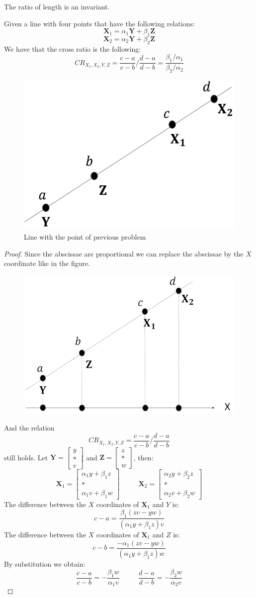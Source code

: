 \documentclass[12pt, a4paper]{report}
\newtheorem[style=M,bodystyle=\normalfont]{theorem}{Theorem}
\newtheorem[style=M,bodystyle=\normalfont]{corollary}{Corollary}
\newtheorem[style=M,bodystyle=\normalfont]{lemma}{Lemma}
\newtheorem[style=M,bodystyle=\normalfont]{definition}{Definition}
\begin{document}
    The ratio of length is an invariant.

    Given a line with four points that have the following relations: 
    \[\textbf{X}_1=\alpha_1\textbf{Y}+\beta_1\textbf{Z}\]
    \[\textbf{X}_2=\alpha_2\textbf{Y}+\beta_2\textbf{Z}\]
    We have that the cross ratio is the following: 
    \[CR_{X_1,X_2,Y,Z}=\dfrac{c-a}{c-b}/\dfrac{d-a}{d-b}=\dfrac{\beta_1/\alpha_1}{\beta_2/\alpha_2}\]
    \begin{figure}[H]
        \centering
        \includegraphics[width=0.25\linewidth]{images/line.png}
        \caption{Line with the point of previous problem}
    \end{figure}
    \begin{proof}
        Since the abscissae are proportional we can replace the abscissae by the $X$ coordinate like in the figure. 
        \begin{figure}[H]
            \centering
            \includegraphics[width=0.4\linewidth]{images/abscissae.png}
        \end{figure}
        And the relation 
        \[CR_{X_1,X_2,Y,Z}=\dfrac{c-a}{c-b}/\dfrac{d-a}{d-b}\]
        still holds. Let $\textbf{Y}=\begin{bmatrix} y \\ * \\ v \end{bmatrix}$ and $\textbf{Z}=\begin{bmatrix} z \\ * \\ w \end{bmatrix}$, then: 
        \[ \textbf{X}_1=\begin{bmatrix} \alpha_1y+\beta_1z \\ * \\ \alpha_1v+\beta_1w \end{bmatrix} \:\:\:\:\:\:\:\:\:\:\:\:
        \textbf{X}_2=\begin{bmatrix} \alpha_2y+\beta_2z \\ * \\ \alpha_2v+\beta_2w \end{bmatrix}\]
        The difference between the $X$ coordinates of $\textbf{X}_1$ and $Y$ is:
        \[c-a=\dfrac{\beta_1(zv-yw)}{(\alpha_1y+\beta_1z)v}\]
        The difference between the $X$ coordinates of $\textbf{X}_1$ and $Z$ is:
        \[c-b=\dfrac{-\alpha_1(zv-yw)}{(\alpha_1y+\beta_1z)w}\]
        By substitution we obtain: 
        \[ \dfrac{c-a}{c-b}=-\dfrac{\beta_1w}{\alpha_1v} \:\:\:\:\:\:\:\:\:\:\:\: \dfrac{d-a}{d-b}=-\dfrac{\beta_2w}{\alpha_2v}\]
    \end{proof}
\end{document}
